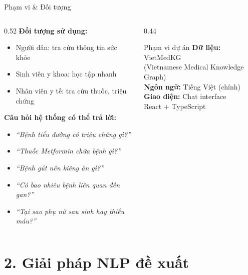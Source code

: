 \documentclass[aspectratio=169, 11pt]{beamer}
\begin{document}
\begin{frame}{Phạm vi \& Đối tượng}
  \begin{columns}[t]
    \begin{column}{0.52\textwidth}
      \textbf{Đối tượng sử dụng:}
      \begin{itemize}
        \item Người dân: tra cứu thông tin sức khỏe
        \item Sinh viên y khoa: học tập nhanh
        \item Nhân viên y tế: tra cứu thuốc, triệu chứng
      \end{itemize}
      \vspace{0.5em}
      \textbf{Câu hỏi hệ thống có thể trả lời:}
      \begin{itemize}
        \scriptsize
        \item \textit{``Bệnh tiểu đường có triệu chứng gì?''}
        \item \textit{``Thuốc Metformin chữa bệnh gì?''}
        \item \textit{``Bệnh gút nên kiêng ăn gì?''}
        \item \textit{``Có bao nhiêu bệnh liên quan đến gan?''}
        \item \textit{``Tại sao phụ nữ sau sinh hay thiếu máu?''}
      \end{itemize}
    \end{column}
    \begin{column}{0.44\textwidth}
      \begin{block}{Phạm vi dự án}
        \textbf{Dữ liệu:} VietMedKG\\
        (Vietnamese Medical Knowledge Graph)\\[4pt]
        \textbf{Ngôn ngữ:} Tiếng Việt (chính)\\[4pt]
        \textbf{Giao diện:} Chat interface\\
        React + TypeScript
      \end{block}
    \end{column}
  \end{columns}
\end{frame}

\section{2. Giải pháp NLP đề xuất}
\end{document}
